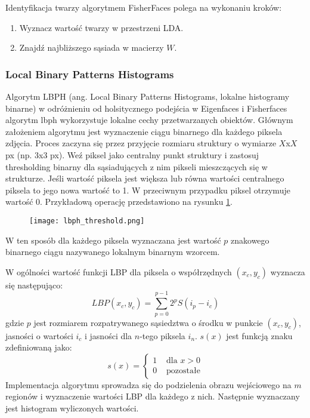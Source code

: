 Identyfikacja twarzy algorytmem FisherFaces polega na wykonaniu kroków:
\begin{enumerate}
\item Wyznacz wartość twarzy w przestrzeni LDA.
\item Znajdź najbliższego sąsiada w macierzy $W$.
\end{enumerate}

\subsubsection{Local Binary Patterns Histograms} \label{lbph}
Algorytm LBPH \cite{opencv_doc}\cite{lbph} (ang. Local Binary Patterns Histograms, lokalne histogramy binarne) w odróżnieniu od holsitycznego podejścia w Eigenfaces i Fisherfaces algorytm lbph wykorzystuje lokalne cechy przetwarzanych obiektów. Głównym założeniem algorytmu jest wyznaczenie ciągu binarnego dla każdego piksela zdjęcia. Proces zaczyna się przez przyjęcie rozmiaru struktury o wymiarze $X$x$X$ px (np. 3x3 px). Weź piksel jako centralny punkt struktury i zastosuj thresholding binarny dla sąsiadujących z nim pikseli mieszczących się w strukturze. Jeśli wartość piksela jest większa lub równa wartości centralnego piksela to jego nowa wartość to 1. W przeciwnym przypadku piksel otrzymuje wartość 0. Przykładową operację przedstawiono na rysunku \ref{fig:lbph_thresh}.
\begin{figure}[H]
	\centering
	\texttt{[image: lbph\_threshold.png]}
	\label{fig:lbph_thresh}
\end{figure}
W ten sposób dla każdego piksela wyznaczana jest wartość $p$ znakowego binarnego ciągu nazywanego lokalnym binarnym wzorcem.

W ogólności wartość funkcji LBP dla piksela o współrzędnych $(x_{c},y_{c})$ wyznacza się następująco:
\begin{equation}
LBP(x_{c},y_{c})=\sum_{p=0}^{p-1}2^{p}S(i_{p}-i_{c})
\end{equation}
gdzie $p$ jest rozmiarem rozpatrywanego sąsiedztwa o środku w punkcie $(x_{c},y_{c})$, jasności o wartości $i_{c}$ i jasności dla $n$-tego piksela $i_{n}$. $s(x)$ jest funkcją znaku zdefiniowaną jako:
\begin{equation}
s(x) = \left\{ \begin{array}{ll}
1 & \textrm{ dla $x>0$}\\
0 & \textrm{ pozostałe}
\end{array} \right.
\end{equation}
Implementacja algorytmu sprowadza się do podzielenia obrazu wejściowego na $m$ regionów i wyznaczenie wartości LBP dla każdego z nich. Następnie wyznaczany jest histogram wyliczonych wartości.

